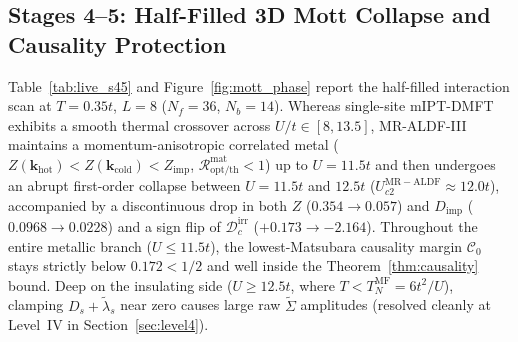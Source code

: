 \documentclass[11pt,a4paper]{article}
\numberwithin{equation}{section}
\theoremstyle{plain}
\theoremstyle{definition}
\providecommand{\vk}{\mathbf{k}}
\begin{document}
\subsection{Stages 4--5: Half-Filled 3D Mott Collapse and Causality Protection}
\label{sec:bench_45}

Table~\ref{tab:live_s45} and Figure~\ref{fig:mott_phase} report the half-filled
interaction scan at $T = 0.35t$, $L = 8$ ($N_f = 36$, $N_b = 14$). Whereas single-site
mIPT-DMFT exhibits a smooth thermal crossover across $U/t \in [8, 13.5]$, MR-ALDF-III
maintains a momentum-anisotropic correlated metal ($Z(\vk_{\mathrm{hot}}) < Z(\vk_{\mathrm{cold}}) < Z_{\mathrm{imp}}$,
$\mathcal{R}_{\mathrm{opt/th}}^{\mathrm{mat}} < 1$) up to $U = 11.5t$ and then undergoes
an abrupt first-order collapse between $U = 11.5t$ and $12.5t$
($U_{c2}^{\mathrm{MR-ALDF}} \approx 12.0t$), accompanied by a discontinuous drop in both
$Z$ ($0.354 \to 0.057$) and $D_{\mathrm{imp}}$ ($0.0968 \to 0.0228$) and a sign flip of
$\mathcal{D}_c^{\mathrm{irr}}$ ($+0.173 \to -2.164$). Throughout the entire metallic
branch ($U \le 11.5t$), the lowest-Matsubara causality margin $\mathcal{C}_0$ stays
strictly below $0.172 < 1/2$ and well inside the Theorem~\ref{thm:causality} bound. Deep
on the insulating side ($U \ge 12.5t$, where $T < T_N^{\mathrm{MF}} = 6t^2/U$), clamping
$D_s + \tilde{\lambda}_s$ near zero causes large raw $\tilde{\Sigma}$ amplitudes
(resolved cleanly at Level~IV in Section~\ref{sec:level4}).
\end{document}
